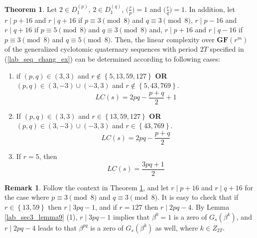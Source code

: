 \documentclass{mcom-l}
\theoremstyle{definition}
\newtheorem{sec3_B_remark1}[sec3_remark1]{Remark}
\newtheorem{sec3thm2}[sec3thm1]{Theorem}
\numberwithin{equation}{section}
\begin{document}
       \begin{sec3thm2}\label{lab_MainThorem_02}
         Let $ 2\in D_{1}^{(p)} $, $ 2\in D_{1}^{(q)} $, $ \bigl(\tfrac{r}{p}\bigr) =1$ and $ \bigl(\tfrac{r}{q}\bigr) =1$. In addition, let $ r\mid p+16 $ and $ r\mid q+16 $ if $ p\equiv 3 \pmod 8 $ and $ q\equiv 3 \pmod 8 $, $ r\mid p-16 $ and $ r\mid q+16 $ if $ p\equiv 5 \pmod 8 $ and $ q\equiv 3 \pmod 8 $ and, $ r\mid p+16 $ and $ r\mid q-16 $ if $ p\equiv 3 \pmod 8 $ and $ q\equiv 5 \pmod 8 $. Then, the linear complexity over $ \mathbf{GF}(r^{m}) $ of the generalized cyclotomic quaternary sequences with period $ 2T $ specified in (\ref{lab_seq_chang_ex}) can be determined according to following cases:
          \begin{enumerate} \item if $ (p,q)\in (3,3) $ and $ r\notin\left\lbrace 5,13,59,127\right\rbrace $ \textbf{OR} $ (p,q)\in (3,-3) \cup (-3,3)$ and $ r\notin\left\lbrace 5,43,769\right\rbrace $.
          \begin{equation*}
          LC(s)=2pq-\dfrac{p+q}{2}+1
          \end{equation*}
\item If $ (p,q)\in (3,3) $ and $ r\in\left\lbrace 13,59,127\right\rbrace $ \textbf{OR} $ (p,q)\in (3,-3) \cup (-3,3)$ and  $ r\in\left\lbrace 43,769\right\rbrace $.
          \begin{equation*}
           LC(s)=2pq-\dfrac{p+q}{2}
           \end{equation*}
\item If $ r=5 $, then 
           \begin{equation*}
             LC(s)=\dfrac{3pq+1}{2}
             \end{equation*}
\end{enumerate}
      \end{sec3thm2}
      
      \begin{sec3_B_remark1}\label{Lab_sec3_B_remark1}
      Follow the context in Theorem \ref{lab_MainThorem_02}, and let  $ r\mid p+16 $ and $ r\mid q+16 $ for the case where $ p\equiv 3 \pmod 8 $ and $ q\equiv 3 \pmod 8 $. It is easy to check that if $ r\in\left\lbrace 13,59\right\rbrace $ then $ r\mid 3pq-1 $, and if $ r=127 $ then $ r\mid 2pq-4 $. By Lemma \ref{lab_sec3_lemma9} (1), $ r\mid 3pq-1 $ implies  that $ \beta^{0}=1 $ is a zero of $ G_{s}(\beta^{k}) $, and $ r\mid 2pq-4 $ leads to that $ \beta^{pq}$ is a zero of $ G_{s}(\beta^{k}) $ as well, where $ k\in Z_{2T} $.
      \end{sec3_B_remark1}
      
\end{document}
